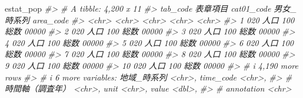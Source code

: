 \documentclass[
  xelatex, ja=standard]{bxjsbook}
\newenvironment{Shaded}{\begin{snugshade}}{\end{snugshade}}
\newcommand{\CommentTok}[1]{\textcolor[rgb]{0.56,0.35,0.01}{\textit{#1}}}
\newcommand{\NormalTok}[1]{#1}
\theoremstyle{definition}
\theoremstyle{definition}
\theoremstyle{definition}
\theoremstyle{definition}
\theoremstyle{remark}
\begin{document}
\begin{Shaded}
\begin{Highlighting}[]
\NormalTok{estat\_pop}
\CommentTok{\#\textgreater{} \# A tibble: 4,200 x 11}
\CommentTok{\#\textgreater{}    tab\_code 表章項目 cat01\_code 男女\_時系列 area\_code}
\CommentTok{\#\textgreater{}    \textless{}chr\textgreater{}    \textless{}chr\textgreater{}    \textless{}chr\textgreater{}      \textless{}chr\textgreater{}       \textless{}chr\textgreater{}    }
\CommentTok{\#\textgreater{}  1 020      人口     100        総数        00000    }
\CommentTok{\#\textgreater{}  2 020      人口     100        総数        00000    }
\CommentTok{\#\textgreater{}  3 020      人口     100        総数        00000    }
\CommentTok{\#\textgreater{}  4 020      人口     100        総数        00000    }
\CommentTok{\#\textgreater{}  5 020      人口     100        総数        00000    }
\CommentTok{\#\textgreater{}  6 020      人口     100        総数        00000    }
\CommentTok{\#\textgreater{}  7 020      人口     100        総数        00000    }
\CommentTok{\#\textgreater{}  8 020      人口     100        総数        00000    }
\CommentTok{\#\textgreater{}  9 020      人口     100        総数        00000    }
\CommentTok{\#\textgreater{} 10 020      人口     100        総数        00000    }
\CommentTok{\#\textgreater{} \# i 4,190 more rows}
\CommentTok{\#\textgreater{} \# i 6 more variables: 地域\_時系列 \textless{}chr\textgreater{}, time\_code \textless{}chr\textgreater{},}
\CommentTok{\#\textgreater{} \#   \textasciigrave{}時間軸（調査年）\textasciigrave{} \textless{}chr\textgreater{}, unit \textless{}chr\textgreater{}, value \textless{}dbl\textgreater{},}
\CommentTok{\#\textgreater{} \#   annotation \textless{}chr\textgreater{}}
\end{Highlighting}
\end{Shaded}
\end{document}

